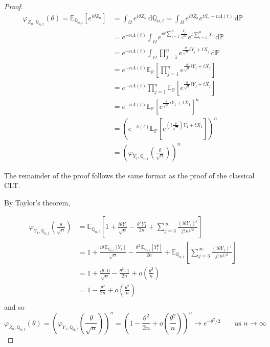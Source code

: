 \documentclass{article}
\newcommand{\E}{\mathbb{E}}
\renewcommand{\P}{\mathbb{P}}
\newcommand{\Q}{\mathbb{Q}}
\begin{document}
\begin{proof}
  \begin{equation}
    \begin{aligned}
      \varphi_{Z_n,\Q_{n,t}}(\theta) = \E_{\Q_{n,t}}\left[ e^{i \theta Z_n} \right]
      &= \int_\Omega  e^{i \theta Z_n} \, \text{d}\Q_{n,t}
      = \int_\Omega  e^{i \theta Z_n} e^{t S_n - n \Lambda(t)} \, \text{d}\P \\
      &= e^{-n\Lambda(t)}\int_\Omega  e^{i \theta \sum_{i=1}^n \frac{Y_i}{\sqrt{n}}} e^{t \sum_{i=1}^n X_i} \, \text{d}\P \\
      &=e^{-n\Lambda(t)}\int_\Omega \prod_{j=1}^n  e^{ \frac{\theta}{\sqrt{n}} iY_j + t X_j} \, \text{d}\P \\
      &=e^{-n\Lambda(t)} \E_\P \left[\prod_{j=1}^n e^{ \frac{\theta}{\sqrt{n}} iY_j + t X_j} \right]\\
      &=e^{-n\Lambda(t)} \prod_{j=1}^n \E_\P\left[ e^{ \frac{\theta}{\sqrt{n}} iY_j + t X_j} \right]\\
      &=e^{-n\Lambda(t)} \E_\P \left[e^{ \frac{\theta}{\sqrt{n}} iY_1 + t X_1} \right]^n\\
      &=\left(e^{-\Lambda(t)} \E_\P \left[e^{\left(i\frac{\theta}{\sqrt{n}}\right) Y_1 + t X_1} \right]\right)^n\\
      &=\boxed{\left(\varphi_{Y_1,\Q_{n,t}}\left(\frac{\theta}{\sqrt{n}}\right)\right)^n}
    \end{aligned}
  \end{equation}

  The remainder of the proof follows the same format as the proof of the classical CLT.

  By Taylor's theorem,

  \begin{equation}
    \begin{aligned}
      \varphi_{Y_1,\Q_{n,t}}\left(\frac{\theta}{\sqrt{n}}\right) &=
      \E_{\Q_{n,t}}\left[ 1 + \frac{i\theta Y_1}{\sqrt{n}} - \frac{\theta^2 Y_1^2}{2n} + \sum_{j=3}^\infty \frac{(i\theta Y_1)^j}{j!\, n^{j/2}} \right] \\
      &= 1 + \frac{i\theta\, \E_{\Q_{n,t}}[Y_1]}{\sqrt{n}} - \frac{\theta^2\, \E_{\Q_{n,t}}[Y_1^2]}{2n} + \E_{\Q_{n,t}}\left[\sum_{j=3}^\infty \frac{(i\theta Y_1)^j}{j!\, n^{j/2}}\right] \\
      &= 1 + \frac{i\theta \cdot 0}{\sqrt{n}} - \frac{\theta^2 \cdot 1}{2n} + o\left(\frac{\theta^2}{n}\right) \\
      &= 1 - \frac{\theta^2}{2n} + o\left(\frac{\theta^2}{n}\right) \\
    \end{aligned}
  \end{equation}
  and so
  \begin{equation}
    \varphi_{Z_n,\Q_{n,t}}(\theta) = \left(\varphi_{Y_1,\Q_{n,t}}\left(\frac{\theta}{\sqrt{n}}\right)\right)^n
    = \left( 1 - \frac{\theta^2}{2n}  + o\left(\frac{\theta^2}{n}\right) \right)^n \to \boxed{e^{-\theta^2/2}} \qquad \text{as } n \to \infty
  \end{equation}


\end{proof}
\end{document}
